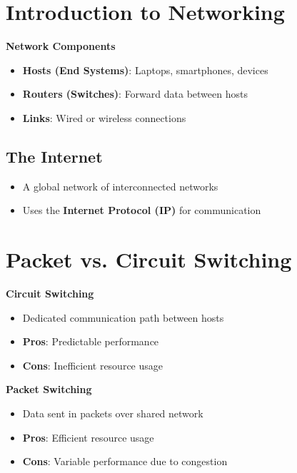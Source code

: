 \documentclass[9pt]{extarticle}
\begin{document}
\small
\begin{multicols*}{3}
{\color{sectioncolor}\section*{\centering Introduction to Networking}}
\textbf{Network Components}
\begin{itemize}
    \item \textbf{Hosts (End Systems)}: Laptops, smartphones, devices
    \item \textbf{Routers (Switches)}: Forward data between hosts
    \item \textbf{Links}: Wired or wireless connections
\end{itemize}

{\color{subsectioncolor}\subsection*{The Internet}}
\begin{itemize}
    \item A global network of interconnected networks
    \item Uses the \textbf{Internet Protocol (IP)} for communication
\end{itemize}

{\color{sectioncolor}\section*{\centering Packet vs. Circuit Switching}}
\textbf{Circuit Switching}
\begin{itemize}
    \item Dedicated communication path between hosts
    \item \textbf{Pros}: Predictable performance
    \item \textbf{Cons}: Inefficient resource usage
\end{itemize}

\textbf{Packet Switching}
\begin{itemize}
    \item Data sent in packets over shared network
    \item \textbf{Pros}: Efficient resource usage
    \item \textbf{Cons}: Variable performance due to congestion
\end{itemize}


\end{multicols*}
\end{document}
